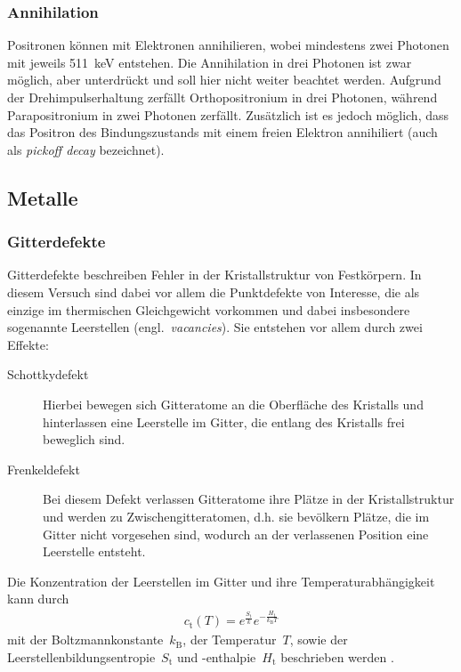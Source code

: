 \documentclass[11pt, a4paper]{article}
\numberwithin{equation}{section}
\begin{document}
\subsubsection{Annihilation}

Positronen können mit Elektronen annihilieren, wobei mindestens zwei Photonen mit jeweils \SI{511}{keV} entstehen.
Die Annihilation in drei Photonen ist zwar möglich, aber unterdrückt und soll hier nicht weiter beachtet werden.
Aufgrund der Drehimpulserhaltung zerfällt Orthopositronium in drei Photonen, während Parapositronium in zwei Photonen zerfällt.
Zusätzlich ist es jedoch möglich, dass das Positron des Bindungszustands mit einem freien Elektron annihiliert (auch als \textit{pickoff decay} bezeichnet). 

\subsection{Metalle}
\subsubsection{Gitterdefekte}
Gitterdefekte beschreiben Fehler in der Kristallstruktur von Festkörpern.
In diesem Versuch sind dabei vor allem die Punktdefekte von Interesse, die als einzige im thermischen Gleichgewicht vorkommen und dabei insbesondere sogenannte Leerstellen (engl.~\textit{vacancies}).
Sie entstehen vor allem durch zwei Effekte:
\begin{description}
	\item[Schottkydefekt]
		Hierbei bewegen sich Gitteratome an die Oberfläche des Kristalls und hinterlassen eine Leerstelle im Gitter, die entlang des Kristalls frei beweglich sind.
	\item[Frenkeldefekt]
		Bei diesem Defekt verlassen Gitteratome ihre Plätze in der Kristallstruktur und werden zu Zwischengitteratomen, d.h. sie bevölkern Plätze, die im Gitter nicht vorgesehen sind, wodurch an der verlassenen Position eine Leerstelle entsteht.
\end{description}
Die Konzentration der Leerstellen im Gitter und ihre Temperaturabhängigkeit kann durch
\begin{align}
c_\mathrm{t}(T) = e^{\frac{S_\mathrm{t}}{k}}e^{-\frac{H_\mathrm{t}}{k_\mathrm{B} T}}
\label{eq:vac_conc}
\end{align}
mit der Boltzmannkonstante~$k_\mathrm{B}$, der Temperatur~$T$, sowie der Leerstellenbildungsentropie~$S_\mathrm{t}$ und -enthalpie~$H_\mathrm{t}$ beschrieben werden \cite{add_infos}.
\end{document}
